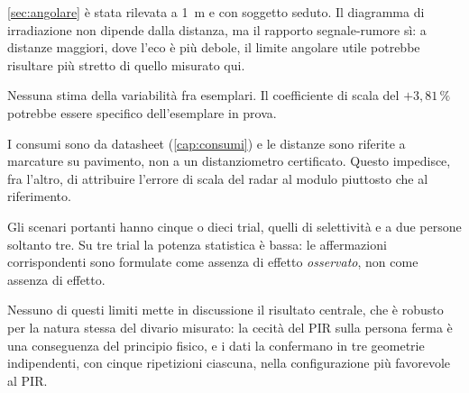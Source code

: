 \begin{description}[leftmargin=1.4em,style=nextline,itemsep=3pt]
    \cref{sec:angolare} è stata rilevata a 1~m e con soggetto seduto. Il diagramma di
    irradiazione non dipende dalla distanza, ma il rapporto segnale-rumore sì: a
    distanze maggiori, dove l'eco è più debole, il limite angolare utile potrebbe
    risultare più stretto di quello misurato qui.
  \item[Un solo esemplare per modello] Nessuna stima della variabilità fra esemplari.
    Il coefficiente di scala del $+3{,}81\,\%$ potrebbe essere specifico dell'esemplare
    in prova.
  \item[Assenza di strumentazione di misura] I consumi sono da datasheet
    (\cref{cap:consumi}) e le distanze sono riferite a marcature su pavimento, non a un
    distanziometro certificato. Questo impedisce, fra l'altro, di attribuire l'errore
    di scala del radar al modulo piuttosto che al riferimento.
  \item[Numero di ripetizioni disomogeneo] Gli scenari portanti hanno cinque o dieci
    trial, quelli di selettività e a due persone soltanto tre. Su tre trial la potenza
    statistica è bassa: le affermazioni corrispondenti sono formulate come assenza di
    effetto \emph{osservato}, non come assenza di effetto.
\end{description}

Nessuno di questi limiti mette in discussione il risultato centrale, che è robusto per
la natura stessa del divario misurato: la cecità del PIR sulla persona ferma è una
conseguenza del principio fisico, e i dati la confermano in tre geometrie indipendenti,
con cinque ripetizioni ciascuna, nella configurazione più favorevole al PIR.
